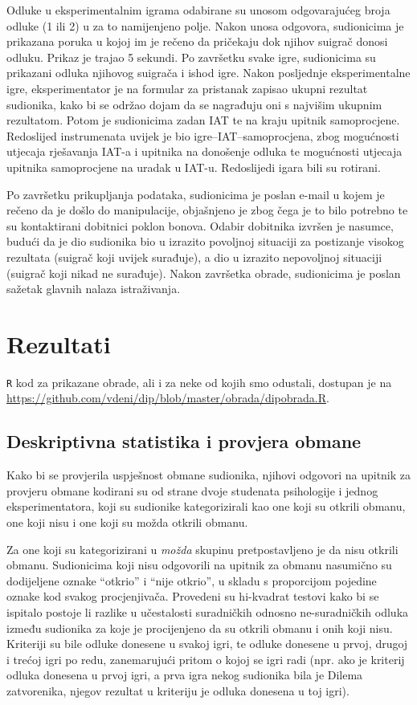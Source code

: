 \documentclass[a4paper, 12pt]{report}
\begin{document}
Odluke u eksperimentalnim igrama odabirane su unosom odgovarajućeg broja odluke
(1 ili 2) u za to namijenjeno polje. Nakon unosa odgovora, sudionicima je
prikazana poruka u kojoj im je rečeno da pričekaju dok njihov suigrač donosi
odluku. Prikaz je trajao 5 sekundi. Po završetku svake igre, sudionicima su
prikazani odluka njihovog suigrača i ishod igre. 
Nakon posljednje eksperimentalne igre, eksperimentator je  na formular za pristanak zapisao
ukupni rezultat sudionika, kako bi se održao dojam da se
nagrađuju oni s najvišim ukupnim rezultatom. Potom je sudionicima zadan IAT
te na kraju upitnik samoprocjene.
Redoslijed instrumenata uvijek je bio igre--IAT--samoprocjena, zbog mogućnosti
utjecaja rješavanja IAT-a i upitnika na donošenje odluka te mogućnosti utjecaja
upitnika samoprocjene na uradak u IAT-u. Redoslijedi
igara bili su rotirani.

Po završetku prikupljanja podataka, sudionicima je poslan e-mail u kojem je
rečeno da je došlo do manipulacije, objašnjeno je zbog čega je to bilo
potrebno  te su kontaktirani dobitnici poklon
bonova. Odabir dobitnika izvršen je nasumce, budući da je dio sudionika bio u izrazito
povoljnoj situaciji za postizanje visokog rezultata (suigrač koji uvijek
surađuje), a dio u izrazito nepovoljnoj situaciji (suigrač koji nikad ne
surađuje). Nakon završetka obrade, sudionicima je poslan sažetak glavnih nalaza
istraživanja.

\section{Rezultati}

\texttt{R} kod za prikazane obrade, ali i za neke od kojih smo odustali,
dostupan je na \url{https://github.com/vdeni/dip/blob/master/obrada/dipobrada.R}.

\subsection{Deskriptivna statistika i provjera obmane} 

Kako bi se provjerila uspješnost obmane sudionika, njihovi odgovori na upitnik
za provjeru obmane kodirani su od strane dvoje studenata psihologije i jednog
eksperimentatora, koji su
sudionike kategorizirali kao one koji su otkrili obmanu, one koji nisu i one
koji su možda otkrili obmanu.

Za one koji su kategorizirani u \emph{možda} skupinu pretpostavljeno je da nisu
otkrili obmanu. Sudionicima koji nisu odgovorili na upitnik za obmanu
nasumično su dodijeljene oznake \enquote{otkrio} i \enquote{nije otkrio},
u skladu s proporcijom pojedine oznake kod svakog procjenjivača.
Provedeni su hi-kvadrat testovi kako bi se ispitalo postoje li
razlike u učestalosti suradničkih odnosno ne-suradničkih odluka između sudionika
za koje je procijenjeno da su otkrili obmanu i onih koji nisu. 
Kriteriji su bile odluke donesene u svakoj igri, te odluke
donesene u prvoj, drugoj i trećoj igri po redu, zanemarujući pritom o kojoj se
igri radi (npr. ako je kriterij odluka donesena u prvoj igri, a prva igra nekog
sudionika bila je Dilema zatvorenika, njegov rezultat u kriteriju je odluka
donesena u toj igri).
\end{document}
